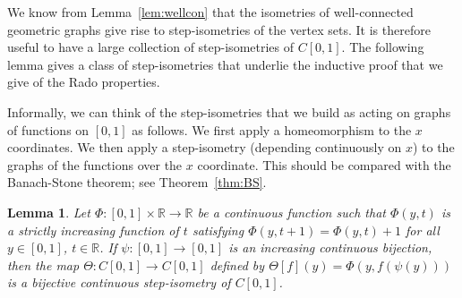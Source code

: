 \documentclass{daj}
\newtheorem{lem}[thm]{Lemma}
\newcommand{\R}{\mathbb R}
\begin{document}
We know from Lemma~\ref{lem:wellcon} that the isometries of well-connected
geometric graphs give rise to step-isometries of the vertex sets. It is therefore
useful to have a large collection of step-isometries of $C[0,1]$. The following lemma gives a class of step-isometries that underlie the inductive
proof that we give of the Rado properties.

Informally, we can think of the step-isometries that we build as acting on graphs of functions on
$[0,1]$ as follows. We first apply a homeomorphism to the $x$ coordinates.
We then apply a step-isometry (depending continuously on $x$) to the graphs
of the functions over the $x$ coordinate.
This should be compared with the Banach-Stone theorem; see Theorem~\ref{thm:BS}.

\begin{lem}\label{lem:stepisos}
Let $\Phi\colon [0,1]\times\R\to \R$ be a continuous function such that
$\Phi(y,t)$ is a strictly increasing function of $t$ satisfying $\Phi(y,t+1)=\Phi(y,t)+1$ for all $y\in [0,1]$,
$t\in\R$.
If $\psi\colon[0,1]\to[0,1]$ is an increasing continuous bijection,
then the map $\Theta\colon C[0,1]\to C[0,1]$ defined by
$\Theta[f](y)=\Phi(y,f(\psi(y)))$ is a bijective continuous step-isometry of $C[0,1]$.
\end{lem}
\end{document}
